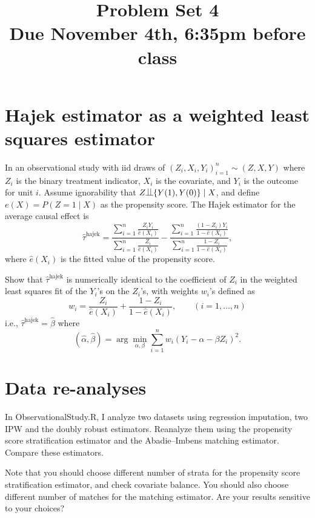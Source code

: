 \documentclass[11pt]{article}
\theoremstyle{definition}
\def\ind{\begin{picture}(9,8)
         \put(0,0){\line(1,0){9}}
         \put(3,0){\line(0,1){8}}
         \put(6,0){\line(0,1){8}}
         \end{picture}
        }
\begin{document}
\doublespacing
\title{\bf  Problem Set 4\\
Due November 4th, 6:35pm before class}
\date{}
\maketitle


\section{Hajek estimator as a weighted least squares estimator}

In an observational study with iid draws of $(Z_i, X_i, Y_i)_{i=1}^n  \sim (Z,X,Y)  $ where $Z_i$ is the binary treatment indicator, $X_i$ is the covariate, and $Y_i$ is the outcome for unit $i.$ Assume ignorability that $Z \ind \{  Y(1), Y(0)\} \mid X$, and define $e(X) = P(Z=1\mid X)$ as the propensity score. The Hajek estimator for the average causal effect is 
$$
\hat{\tau}^{\text{hajek}} =  \frac{  \sum_{i=1}^n  \frac{Z_i Y_i}{  \hat{e}(X_i) }  }{  \sum_{i=1}^n  \frac{Z_i }{  \hat{e}(X_i) }  }
-  \frac{  \sum_{i=1}^n  \frac{(1-Z_i) Y_i}{ 1- \hat{e}(X_i) }  }{  \sum_{i=1}^n  \frac{1-Z_i }{ 1- \hat{e}(X_i) }  },
$$
where $\hat{e}(X_i)$ is the fitted value of the propensity score.

Show that $\hat{\tau}^{\text{hajek}} $ is numerically identical to the coefficient of $Z_i$ in the weighted least squares fit of the $Y_i$'s on the $Z_i$'s, with weights $w_i$'s defined as 
$$
w_i = \frac{Z_i}{  \hat{e}(X_i)} +  \frac{1 - Z_i}{  1-  \hat{e}(X_i)} ,\qquad (i=1,\ldots, n)
$$
i.e., $\hat{\tau}^{\text{hajek}}  = \hat{\beta}$ where
$$
(\hat{\alpha}, \hat{\beta}) = \arg\min_{\alpha, \beta} \sum_{i=1}^n w_i(Y_i - \alpha - \beta Z_i)^2.
$$


 


\section{Data re-analyses}


In ObservationalStudy.R, I analyze two datasets using regression imputation, two IPW and the doubly robust estimators. Reanalyze them using the propensity score stratification estimator and the Abadie--Imbens matching estimator. Compare these estimators. 

Note that you should choose different number of strata for the propensity score stratification estimator, and check covariate balance. You should also choose different number of matches for the matching estimator. Are your results sensitive to your choices? 
\end{document}
